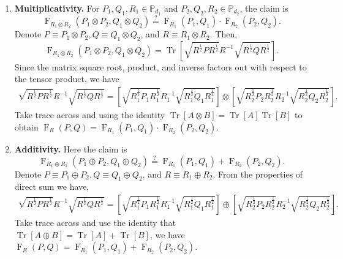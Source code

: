 \documentclass[12pt]{article}
\theoremstyle{definition}
\newcommand{\iseq}{\overset{?}{=}}
\newcommand{\Fg}[3]{\operatorname{F}_{#3}\!\left(#1, #2\right)}
\begin{document}
\begin{enumerate}[noitemsep, left=0pt]
    \item \textbf{Multiplicativity.} For $P_1,Q_1,R_1 \in \mathbb P_{d_1}$ and $P_2,Q_2,R_2 \in \mathbb P_{d_2}$, the claim is
    \begin{equation}
        \Fg{P_1 \otimes P_2}{Q_1 \otimes Q_2}{R_1 \otimes R_2} \iseq \Fg{P_1}{Q_1}{R_1} \cdot \Fg{P_2}{Q_2}{R_2}. 
    \end{equation}
    Denote $P \equiv P_1 \otimes P_2, Q \equiv Q_1 \otimes Q_2$, and $R \equiv R_1 \otimes R_2$. Then,
    \begin{equation}
        \Fg{P_1 \otimes P_2}{Q_1 \otimes Q_2}{R_1 \otimes R_2} = \operatorname{Tr}\left[\sqrt{ R^{\frac12} P R^{\frac12}} R^{-1}\sqrt{ R^{\frac12} Q R^{\frac12}}\right]. 
    \end{equation}
    Since the matrix square root, product, and inverse factors out with respect to the tensor product, we have
    \begin{equation}
    \begin{aligned}
        \sqrt{ R^{\frac12} P R^{\frac12}} R^{-1}\sqrt{ R^{\frac12} Q R^{\frac12}} = 
       \left [\sqrt{ R_1^{\frac12} P_1 R_1^{\frac12}}   R_1^{-1}\sqrt{ R_1^{\frac12} Q_1 R_1^{\frac12}}  \right] \otimes \left [\sqrt{ R_2^{\frac12} P_2 R_2^{\frac12}} R_2^{-1}\sqrt{ R_2^{\frac12} Q_2 R_2^{\frac12}}  \right].
    \end{aligned}
    \end{equation}
    Take trace across and using the identity $\operatorname{Tr}[A \otimes B] = \operatorname{Tr}[A] \operatorname{Tr}[B]$ to obtain
    $\operatorname{F}_R(P,Q) = \operatorname{F}_{R_1}(P_1,Q_1) \cdot \operatorname{F}_{R_2}(P_2,Q_2). $

    \item \textbf{Additivity.} Here the claim is
    \begin{equation}
        \Fg{P_1 \oplus P_2}{Q_1 \oplus Q_2}{R_1 \oplus R_2} \iseq \Fg{P_1}{Q_1}{R_1} + \Fg{P_2}{Q_2}{R_2}. 
    \end{equation}
    Denote $P \equiv P_1 \oplus P_2, Q \equiv Q_1 \oplus Q_2$, and $R \equiv R_1 \oplus R_2$. From the properties of direct sum we have,
    \begin{equation}
    \begin{aligned}
        \sqrt{ R^{\frac12} P R^{\frac12}} R^{-1}\sqrt{ R^{\frac12} Q R^{\frac12}} = 
       \left [\sqrt{ R_1^{\frac12} P_1 R_1^{\frac12}}   R_1^{-1}\sqrt{ R_1^{\frac12} Q_1 R_1^{\frac12}}  \right] \oplus \left [\sqrt{ R_2^{\frac12} P_2 R_2^{\frac12}} R_2^{-1}\sqrt{ R_2^{\frac12} Q_2 R_2^{\frac12}}  \right].
    \end{aligned}
    \end{equation}
    Take trace across and use the identity that $ \operatorname{Tr}[A \oplus B] = \operatorname{Tr}[A]+\operatorname{Tr}[B]$, we have $\operatorname{F}_R(P,Q) = \Fg{P_1}{Q_1}{R_1} +  \Fg{P_2}{Q_2}{R_2}$.


\end{enumerate}
\end{document}
